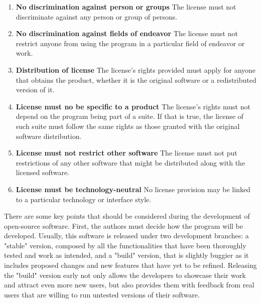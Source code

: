\documentclass[Lau,oneside]{sapthesis}%
\begin{document}
\begin{enumerate}
    \item \textbf{No discrimination against person or groups} \newline
    The license must not discriminate against any person or group of persons.
    
    \item \textbf{No discrimination against fields of endeavor} \newline
    The license must not restrict anyone from using the program in a particular field of endeavor or work.
    
    \item \textbf{Distribution of license} \newline
    The license's rights provided must apply for anyone that obtains the product, whether it is the original software or a redistributed version of it.
    
    \item \textbf{License must no be specific to a product} \newline
    The license's rights must not depend on the program being part of a suite. If that is true, the license of such suite must follow the same rights as those granted with the original software distribution. 
    
    \item \textbf{License must not restrict other software} \newline
    The license must not put restrictions of any other software that might be distributed along with the licensed software.
    
    \item \textbf{License must be technology-neutral} \newline
    No license provision may be linked to a particular technology or interface style.
\end{enumerate}
There are some key points that should be considered during the development of open-source software.
\newline \newline
First, the authors must decide how the program will be developed.
\newline
Usually, this software is released under two development branches: a "stable" version, composed by all the functionalities that have been thoroughly tested and work as intended, and a "build" version, that is slightly buggier as it includes proposed changes and new features that have yet to be refined.
Releasing the "build" version early not only allows the developers to showcase their work and attract even more new users, but also provides them with feedback from real users that are willing to run untested versions of their software.
\end{document}
